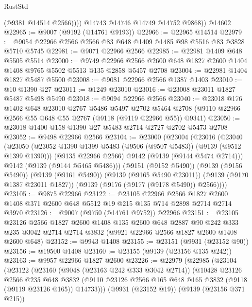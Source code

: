 \begin{lexlean}{RustStd}
\begin{coremodule}
              (@9381 @14514 @2566))))
        @14743
        @14746
        @14749
        @14752
        @9868))
    @14602
@22965 := @9007 (@9192 (@14761 @9193))
@22966 := @22965 @14514
@22979 := @9054 @22966 @2566 @2566 @83 @648 @1409 @1485 @98 @5516 @83 @3828 @5710 @5745
@22981 := @9071 @22966 @2566
@22985 := @22981 @1409 @648 @5505 @5514
@23000 := @9749
    @22966
    @2566
    @2600
    @648
    @1827
    @2600
    @1404
    @1408
    @9765
    @5502
    @5513
    @135
    @2858
    @5457
    @2708
@23004 := @22981 @1404 @1827 @5487 @5500
@23008 := @9081 @22966 @2566 @1387 @1403
@23010 := @10 @1390 @27
@23011 := @1249 @23010
@23016 := @23008 @23011 @1827 @5487 @5498 @5490
@23018 := @9094 @22966 @2566
@23040 := @23018
    @176
    @1402
    @648
    @23010
    @2767
    @5486
    @5497
    @2702
    @5464
    @2708
    (@9110 @22966 @2566 @55 @648 @55 @2767 (@9118 (@9119 @22966 @55)) @9341)
@23050 := @23018 @1400 @158 @1390 @27 @5483 @2714 @2727 @2702 @5473 @2708
@23052 := @9498 @22966 @2566
@23104 := @23000
    (@23004
      (@23016
        (@23040
          (@23050
            (@23052 @1390 @1399 @5483 (@9506 (@9507 @5483)) (@9139 (@9512 @1399 @1390)))
            (@9135 @22966 @2566)
            @9142
            (@9139 (@9144 @5474 @2714)))
          @9142
          (@9139 (@9144 @5465 @5486)))
        (@9151 (@9152 @5490))
        (@9139 (@9156 @5490))
        (@9139 (@9161 @5490))
        (@9139 (@9165 @5490 @23011))
        (@9139 (@9170 @1387 @23011 @1827))
        (@9139 (@9176 (@9177 (@9178 @5490)) @2566))))
@23105 := @9875 @22966
@23122 := @23105
    @22966
    @2566
    @1827
    @2600
    @1408
    @371
    @2600
    @648
    @5512
    @19
    @215
    @135
    @714
    @2898
    @2714
    @2714
    @3970
@23126 := @9007 (@9750 (@14761 @9752)) @22966
@23151 := @23105
    @23126
    @2566
    @1827
    @2600
    @1408
    @135
    @2600
    @648
    @2887
    @90
    @242
    @333
    @235
    @3042
    @2714
    @2714
    @3832
    (@9921 @22966 @2566 @1827 @2600 @1408 @2600 @648)
@23152 := @9943 @1408
@23155 := @23151 (@9931 (@23152 @90))
@23156 := @19500 @1408
@23160 := @23155 (@9139 (@23156 @135 @242))
@23163 := @9957 @22966 @1827 @2600
@23226 := @22979
    (@22985
      (@23104
        (@23122
          (@23160
            (@9048 (@23163 @242 @333 @3042 @2714))
            (@10428
              @23126
              @2566
              @235
              @648
              @3832
              (@9110 @23126 @2566 @165 @648 @165 @3832 (@9118 (@9119 @23126 @165)) @14733)))
          (@9931 (@23152 @19))
          (@9139 (@23156 @371 @215))

\end{coremodule}
\end{lexlean}
